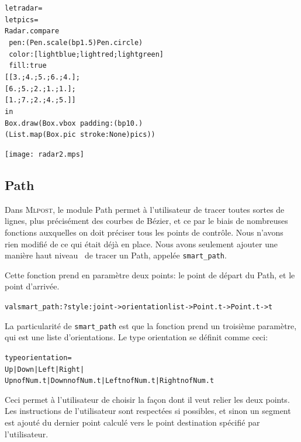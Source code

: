 \documentclass[a4paper,12pt]{article}
\newcommand{\mlpost}{\textsc{Mlpost}}
\begin{document}
\bigskip

\begin{minipage}{0.5\linewidth}
  \begin{alltt}
    let radar =
    let pics =
    Radar.compare
    ~pen:(Pen.scale (bp 1.5) Pen.circle)
    ~color:[lightblue;lightred;lightgreen] 
    ~fill:true
    [[3.;4.;5.;6.;4.];
      [6.;5.;2.;1.;1.];
      [1.;7.;2.;4.;5.]]
    in
    Box.draw (Box.vbox ~padding:(bp 10.) 
    (List.map (Box.pic ~stroke:None) pics))

  \end{alltt}
\end{minipage}
\begin{minipage}{0.5\linewidth}
\begin{center}
\texttt{[image: radar2.mps]}
\end{center}
\end{minipage}

\subsection{Path}
Dans \mlpost, le module Path permet à l'utilisateur de tracer toutes sortes de lignes, plus précisément des courbes de Bézier, et ce par le biais de nombreuses fonctions auxquelles on doit préciser tous les points de contrôle.
Nous n'avons rien modifié de ce qui était déjà en place. Nous avons seulement ajouter une manière \og haut niveau \fg\ de tracer un Path, appelée \texttt{smart\_path}. 
\bigskip 

Cette fonction prend en paramètre deux points: le point de départ du Path, et le point d'arrivée. 
\begin{alltt}
  val smart_path : ?style:joint -> orientation list -> Point.t -> Point.t -> t
\end{alltt}
\bigskip 

La particularité de \texttt{smart\_path} est que la fonction prend un troisième paramètre, qui est une liste d'orientations.
Le type orientation se définit comme ceci:
\begin{alltt}
  type orientation =
  Up | Down | Left | Right |
  Upn of Num.t | Downn of Num.t | Leftn of Num.t | Rightn of Num.t
\end{alltt}

Ceci permet à l'utilisateur de choisir la façon dont il veut relier les deux points. Les instructions de l'utilisateur sont respectées si possibles, et sinon un segment est ajouté du dernier point calculé vers le point destination spécifié par l'utilisateur.
\end{document}
